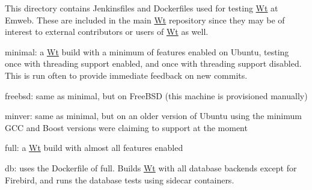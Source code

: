 This directory contains Jenkinsfiles and Dockerfiles used for testing \mbox{\hyperlink{classWt}{Wt}} at Emweb. These are included in the main \mbox{\hyperlink{classWt}{Wt}} repository since they may be of interest to external contributors or users of \mbox{\hyperlink{classWt}{Wt}} as well.


\begin{DoxyItemize}
\item {\ttfamily minimal}\+: a \mbox{\hyperlink{classWt}{Wt}} build with a minimum of features enabled on Ubuntu, testing once with threading support enabled, and once with threading support disabled. This is run often to provide immediate feedback on new commits.
\item {\ttfamily freebsd}\+: same as {\ttfamily minimal}, but on Free\+B\+SD (this machine is provisioned manually)
\item {\ttfamily minver}\+: same as {\ttfamily minimal}, but on an older version of Ubuntu using the minimum G\+CC and Boost versions we\textquotesingle{}re claiming to support at the moment
\item {\ttfamily full}\+: a \mbox{\hyperlink{classWt}{Wt}} build with almost all features enabled
\item {\ttfamily db}\+: uses the Dockerfile of {\ttfamily full}. Builds \mbox{\hyperlink{classWt}{Wt}} with all database backends except for Firebird, and runs the database tests using sidecar containers. 
\end{DoxyItemize}